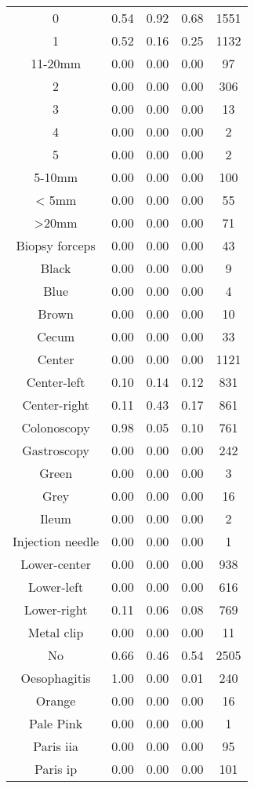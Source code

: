 \begin{center}
\begin{longtable}{|c|c|c|c|c|}
0 & 0.54 & 0.92 & 0.68 & 1551 \\
1 & 0.52 & 0.16 & 0.25 & 1132 \\
11-20mm & 0.00 & 0.00 & 0.00 & 97 \\
2 & 0.00 & 0.00 & 0.00 & 306 \\
3 & 0.00 & 0.00 & 0.00 & 13 \\
4 & 0.00 & 0.00 & 0.00 & 2 \\
5 & 0.00 & 0.00 & 0.00 & 2 \\
5-10mm & 0.00 & 0.00 & 0.00 & 100 \\
< 5mm & 0.00 & 0.00 & 0.00 & 55 \\
>20mm & 0.00 & 0.00 & 0.00 & 71 \\
Biopsy forceps & 0.00 & 0.00 & 0.00 & 43 \\
Black & 0.00 & 0.00 & 0.00 & 9 \\
Blue & 0.00 & 0.00 & 0.00 & 4 \\
Brown & 0.00 & 0.00 & 0.00 & 10 \\
Cecum & 0.00 & 0.00 & 0.00 & 33 \\
Center & 0.00 & 0.00 & 0.00 & 1121 \\
Center-left & 0.10 & 0.14 & 0.12 & 831 \\
Center-right & 0.11 & 0.43 & 0.17 & 861 \\
Colonoscopy & 0.98 & 0.05 & 0.10 & 761 \\
Gastroscopy & 0.00 & 0.00 & 0.00 & 242 \\
Green & 0.00 & 0.00 & 0.00 & 3 \\
Grey & 0.00 & 0.00 & 0.00 & 16 \\
Ileum & 0.00 & 0.00 & 0.00 & 2 \\
Injection needle & 0.00 & 0.00 & 0.00 & 1 \\
Lower-center & 0.00 & 0.00 & 0.00 & 938 \\
Lower-left & 0.00 & 0.00 & 0.00 & 616 \\
Lower-right & 0.11 & 0.06 & 0.08 & 769 \\
Metal clip & 0.00 & 0.00 & 0.00 & 11 \\
No & 0.66 & 0.46 & 0.54 & 2505 \\
Oesophagitis & 1.00 & 0.00 & 0.01 & 240 \\
Orange & 0.00 & 0.00 & 0.00 & 16 \\
Pale Pink & 0.00 & 0.00 & 0.00 & 1 \\
Paris iia & 0.00 & 0.00 & 0.00 & 95 \\
Paris ip & 0.00 & 0.00 & 0.00 & 101 \\

\end{longtable}
\end{center}
